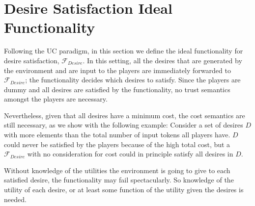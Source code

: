 \section{Desire Satisfaction Ideal Functionality}
  Following the UC paradigm, in this section we define the ideal functionality for desire satisfaction, $\mathcal{F}_{Desire}$.
  In this setting, all the desires that are generated by the environment and are input to the players are immediately forwarded
  to $\mathcal{F}_{Desire}$; the functionality decides which desires to satisfy. Since the players are dummy and all desires
  are satisfied by the functionality, no trust semantics amongst the players are necessary.
  
  Nevertheless, given that all desires have a minimum cost, the cost semantics are still necessary, as we show with the
  following example: Consider a set of desires $D$ with more elements than the total number of input tokens all players have.
  $D$ could never be satisfied by the players because of the high total cost, but a $\mathcal{F}_{Desire}$ with no
  consideration for cost could in principle satisfy all desires in $D$.

  Without knowledge of the utilities the environment is going to give to each satisfied desire, the functionality may fail
  spectacularly. So knowledge of the utility of each desire, or at least some function of the utility given the desires is
  needed.
